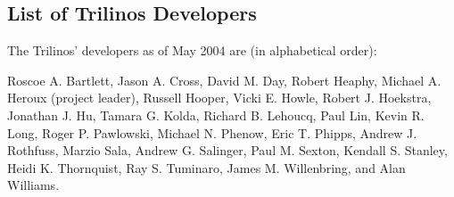 
\subsection{List of Trilinos Developers}
\label{sec:intro_incomplete}

The Trilinos' developers as of May 2004 are (in alphabetical order):

Roscoe A. Bartlett,
Jason A. Cross,
David M. Day,
Robert Heaphy,
Michael A. Heroux (project leader),
Russell Hooper,
Vicki E. Howle,
Robert J. Hoekstra,
Jonathan J. Hu,
Tamara G. Kolda,
Richard B. Lehoucq,
Paul Lin,
Kevin R. Long,
Roger P. Pawlowski,
Michael N. Phenow,
Eric T. Phipps,
Andrew J. Rothfuss,
Marzio Sala,
Andrew G. Salinger,
Paul M. Sexton,
Kendall S. Stanley,
Heidi K. Thornquist,
Ray S. Tuminaro,
James M. Willenbring, and
Alan Williams.

